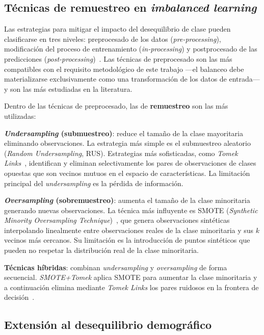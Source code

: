 \subsection{Técnicas de remuestreo en \emph{imbalanced learning}}
\label{subsec:tecnicas_remuestreo}

Las estrategias para mitigar el impacto del desequilibrio de clase pueden clasificarse en tres niveles: preprocesado de los datos (\emph{pre-processing}), modificación del proceso de entrenamiento (\emph{in-processing}) y postprocesado de las predicciones (\emph{post-processing})~\cite{fernandez2018learning}. Las técnicas de preprocesado son las más compatibles con el requisito metodológico de este trabajo —el balanceo debe materializarse exclusivamente como una transformación de los datos de entrada— y son las más estudiadas en la literatura.

Dentro de las técnicas de preprocesado, las de \textbf{remuestreo} son las más utilizadas:

\textbf{\emph{Undersampling} (submuestreo)}: reduce el tamaño de la clase mayoritaria eliminando observaciones. La estrategia más simple es el submuestreo aleatorio (\emph{Random Undersampling}, RUS). Estrategias más sofisticadas, como \emph{Tomek Links}~\cite{tomek1976two}, identifican y eliminan selectivamente los pares de observaciones de clases opuestas que son vecinos mutuos en el espacio de características. La limitación principal del \emph{undersampling} es la pérdida de información.

\textbf{\emph{Oversampling} (sobremuestreo)}: aumenta el tamaño de la clase minoritaria generando nuevas observaciones. La técnica más influyente es SMOTE (\emph{Synthetic Minority Oversampling Technique})~\cite{chawla2002smote}, que genera observaciones sintéticas interpolando linealmente entre observaciones reales de la clase minoritaria y sus $k$ vecinos más cercanos. Su limitación es la introducción de puntos sintéticos que pueden no respetar la distribución real de la clase minoritaria.

\textbf{Técnicas híbridas}: combinan \emph{undersampling} y \emph{oversampling} de forma secuencial. \emph{SMOTE+Tomek} aplica SMOTE para aumentar la clase minoritaria y a continuación elimina mediante \emph{Tomek Links} los pares ruidosos en la frontera de decisión~\cite{batista2004study}.

\subsection{Extensión al desequilibrio demográfico}
\label{subsec:desequilibrio_demografico_extension}


